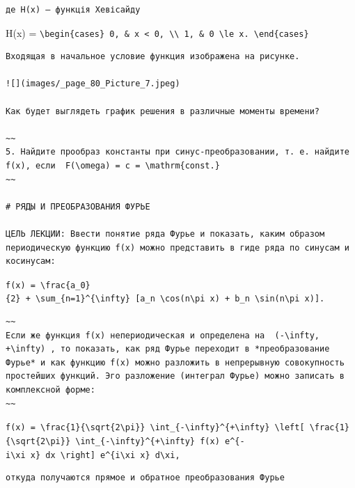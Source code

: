 \documentclass[
  ukrainian,
]{article}
\begin{document}
\begin{verbatim}
де H(x) — функція Хевісайду
\end{verbatim}

H(x) =
\texttt{\textbackslash{}begin\{cases\}\ 0,\ \&\ x\ \textless{}\ 0,\ \textbackslash{}\textbackslash{}\ 1,\ \&\ 0\ \textbackslash{}le\ x.\ \textbackslash{}end\{cases\}}

\begin{verbatim}
Входящая в начальное условие функция изображена на рисунке.

![](images/_page_80_Picture_7.jpeg)

Как будет выглядеть график решения в различные моменты времени?

~~
5. Найдите прообраз константы при синус-преобразовании, т. е. найдите f(x), если  F(\omega) = c = \mathrm{const.}
~~

# РЯДЫ И ПРЕОБРАЗОВАНИЯ ФУРЬЕ

ЦЕЛЬ ЛЕКЦИИ: Ввести понятие ряда Фурье и показать, каким образом периодическую функцию f(x) можно представить в гиде ряда по синусам и косинусам:
\end{verbatim}

\texttt{f(x)\ =\ \textbackslash{}frac\{a\_0\}\{2\}\ +\ \textbackslash{}sum\_\{n=1\}\^{}\{\textbackslash{}infty\}\ {[}a\_n\ \textbackslash{}cos(n\textbackslash{}pi\ x)\ +\ b\_n\ \textbackslash{}sin(n\textbackslash{}pi\ x){]}.}

\begin{verbatim}
~~
Если же функция f(x) непериодическая и определена на  (-\infty, +\infty) , то показать, как ряд Фурье переходит в *преобразование Фурье* и как функцию f(x) можно разложить в непрерывную совокупность простейших функций. Эго разложение (интеграл Фурье) можно записать в комплексной форме:
~~
\end{verbatim}

\texttt{f(x)\ =\ \textbackslash{}frac\{1\}\{\textbackslash{}sqrt\{2\textbackslash{}pi\}\}\ \textbackslash{}int\_\{-\textbackslash{}infty\}\^{}\{+\textbackslash{}infty\}\ \textbackslash{}left{[}\ \textbackslash{}frac\{1\}\{\textbackslash{}sqrt\{2\textbackslash{}pi\}\}\ \textbackslash{}int\_\{-\textbackslash{}infty\}\^{}\{+\textbackslash{}infty\}\ f(x)\ e\^{}\{-i\textbackslash{}xi\ x\}\ dx\ \textbackslash{}right{]}\ e\^{}\{i\textbackslash{}xi\ x\}\ d\textbackslash{}xi,}

\begin{verbatim}
откуда получаются прямое и обратное преобразования Фурье
\end{verbatim}
\end{document}
